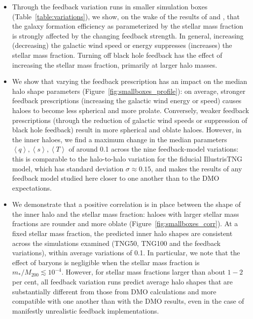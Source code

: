 \documentclass[fleqn,usenatbib]{mnras}
\begin{document}
\begin{itemize}
\item 
Through the feedback variation runs in smaller simulation boxes (Table~\ref{table:variations}), we show, on the wake of the results of \citealt{Weinberg08v678} and \citealt{Pillepich18v473}, that the galaxy formation efficiency as parameterized  by the stellar mass fraction is strongly affected by the changing feedback strength.
In general, increasing (decreasing) the galactic wind speed or energy suppresses (increases) the stellar mass fraction.
Turning off black hole feedback has the effect of increasing the stellar mass fraction, primarily at larger halo masses.\\


\item  
We show that varying the feedback prescription has an impact on the median halo shape parameters (Figure~\ref{fig:smallboxes_profile}):
on average, stronger feedback prescriptions (increasing the galactic wind energy or speed) causes haloes to become less spherical and more prolate.
Conversely, weaker feedback prescriptions (through the reduction of galactic wind speeds or suppression of black hole feedback) result in more spherical and oblate haloes.
However, in  the inner haloes, we find a maximum change in the median parameters $\left<q\right>, \left<s\right>, \left<T\right>$ of around 0.1 across the nine feedback-model variations: this is comparable to the halo-to-halo variation for the fiducial IllustrisTNG model, which has standard deviation $\sigma \approx 0.15$, and makes the results of any feedback model studied here closer to one another than to the DMO expectations.\\



\item 
We demonstrate that a positive correlation is in place between the shape of the inner halo and the stellar mass fraction: haloes with larger stellar mass fractions are rounder and more oblate (Figure~\ref{fig:smallboxes_corr}).
At a fixed stellar mass fraction, the predicted inner halo shapes are consistent across the simulations examined (TNG50, TNG100 and the feedback variations), within average variations of 0.1. 
In particular, we note that the effect of baryons is negligible when the stellar mass fraction is $m_*/M_{200} \lesssim 10^{-4}$. However, for stellar mass fractions larger than about $1-2$ per cent, all feedback variation runs predict average halo shapes that are substantially different from those from DMO calculations and more compatible with one another than with the DMO results, even in the case of manifestly unrealistic feedback implementations. \\




\end{itemize}
\end{document}
